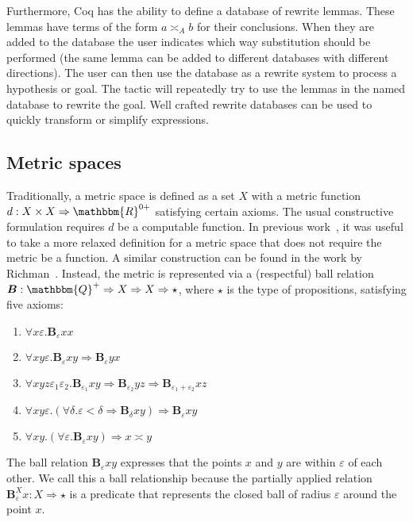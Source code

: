 \documentclass{elsarticle}
\newcommand{\tmem}[1]{{\em #1\/}}
\newcommand{\tmmathbf}[1]{\ensuremath{\boldsymbol{#1}}}
\newcommand{\tmtexttt}[1]{{\ttfamily{#1}}}
\newcommand{\upl}{+}
\newcommand{\ballsym}{\ensuremath{\tmmathbf{B}}}
\newcommand{\ball}[4]{\ensuremath{\ballsym^{#1}_{#2}  #3  #4}}
\begin{document}
Furthermore, Coq has the ability to define a database of rewrite lemmas. These
lemmas have terms of the form $a \asymp_A b$ for their conclusions. When they
are added to the database the user indicates which way substitution should be
performed (the same lemma can be added to different databases with different
directions). The user can then use the database as a rewrite system to process
a hypothesis or goal. The \tmtexttt{autorewrite {\tmem{<database>}}} tactic
will repeatedly try to use the lemmas in the named database to rewrite the
goal. Well crafted rewrite databases can be used to quickly transform or
simplify expressions.

\subsection{Metric spaces}\label{ss:MS}Traditionally, a metric space is
defined as a set $X$ with a metric function $d : X \times X \Rightarrow
\mathbbm{R}^{0 \upl}$ satisfying certain axioms. The usual constructive
formulation requires $d$ be a computable function. In previous
work~{\cite{OConnor:mscs}}, it was useful to take a more relaxed definition
for a metric space that does not require the metric be a function. A similar
construction can be found in the work by Richman~{\cite{Richman:2008}}.
Instead, the metric is represented via a (respectful) ball relation $\ballsym
: \mathbbm{Q}^+ \Rightarrow X \Rightarrow X \Rightarrow \star$, where $\star$
is the type of propositions, satisfying five axioms:
\begin{enumerate}
  \item $\forall x \varepsilon . \ball{}{\varepsilon}{x}{x}$
  
  \item $\forall x y \varepsilon . \ball{}{\varepsilon}{x}{y} \Rightarrow
  \ball{}{\varepsilon}{y}{x}$
  
  \item $\forall x y z \varepsilon_1 \varepsilon_2 .
  \ball{}{\varepsilon_1}{x}{y} \Rightarrow \ball{}{\varepsilon_2}{y}{z}
  \Rightarrow \ball{}{\varepsilon_1 + \varepsilon_2}{x}{z}$
  
  \item $\forall x y \varepsilon . (\forall \delta . \varepsilon < \delta
  \Rightarrow \ball{}{\delta}{x}{y}) \Rightarrow \ball{}{\varepsilon}{x}{y}$
  
  \item $\forall x y. (\forall \varepsilon . \ball{}{\varepsilon}{x}{y})
  \Rightarrow x \asymp y$
\end{enumerate}
The ball relation {\ball{}{{\varepsilon}}{x}{y}} expresses that the points $x$
and $y$ are within $\varepsilon$ of each other. We call this a ball
relationship because the partially applied relation $\ballsym^X_{\varepsilon}
x : X \Rightarrow \star$ is a predicate that represents the closed ball of
radius $\varepsilon$ around the point $x$.
\end{document}
